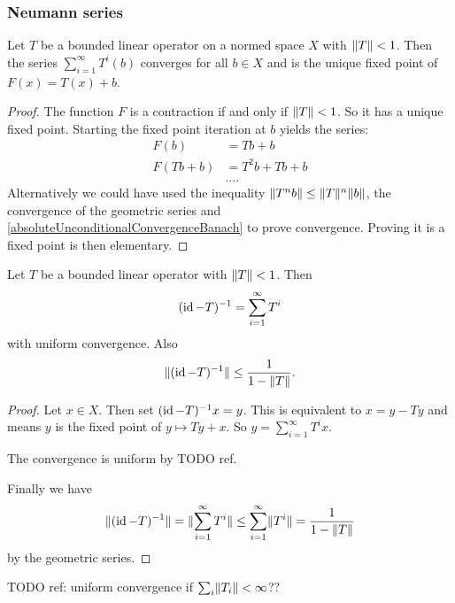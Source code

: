 \subsubsection{Neumann series}
\begin{lemma}
Let $T$ be a bounded linear operator on a normed space $X$ with $\lVert T\rVert<1$. Then the series $\sum^\infty_{i=1}T^i(b)$ converges for all $b\in X$ and is the unique fixed point of $F(x) = T(x)+b$.
\end{lemma}
\begin{proof}
The function $F$ is a contraction if and only if $\lVert T\rVert<1$. So it has a unique fixed point. Starting the fixed point iteration at $b$ yields the series:
\begin{align*}
F(b) &= Tb + b \\
F(Tb+b) &= T^2b + Tb + b \\
&\hdots.
\end{align*}
Alternatively we could have used the inequality $\lVert T^nb\rVert \leq \lVert T\rVert^n\lVert b\rVert$, the convergence of the geometric series and \ref{absoluteUnconditionalConvergenceBanach} to prove convergence. Proving it is a fixed point is then elementary.
\end{proof}
\begin{corollary} \label{operatorNeumannSeries}
Let $T$ be a bounded linear operator with $\lVert T\rVert<1$. Then
\[ (\operatorname{id} - T)^{-1} = \sum_{i=1}^\infty T^i \]
with uniform convergence. Also
\[ \lVert(\operatorname{id} - T)^{-1}\rVert \leq \frac{1}{1-\lVert T\rVert}. \]
\end{corollary}
\begin{proof}
Let $x\in X$. Then set $(\operatorname{id} - T)^{-1}x = y$. This is equivalent to $x = y-Ty$ and means $y$ is the fixed point of $y\mapsto Ty+x$. So $y = \sum_{i=1}^\infty T^ix$.

The convergence is uniform by TODO ref.

Finally we have
\[ \lVert(\operatorname{id} - T)^{-1}\rVert = \lVert\sum_{i=1}^\infty T^i\rVert \leq \sum_{i=1}^\infty \lVert T^i\rVert = \frac{1}{1-\lVert T\rVert} \]
by the geometric series.
\end{proof}
TODO ref: uniform convergence if $\sum_i \lVert T_i\rVert < \infty$??


